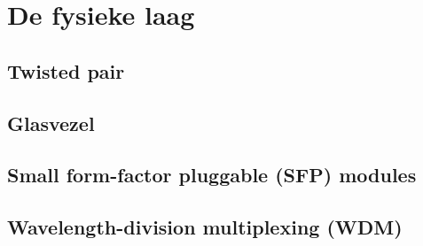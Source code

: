 \chapter{De fysieke laag}

\section{Twisted pair}

\section{Glasvezel}

\section{Small form-factor pluggable (SFP) modules}
\label{sec:sfp-modules}

\section{Wavelength-division multiplexing (WDM)}